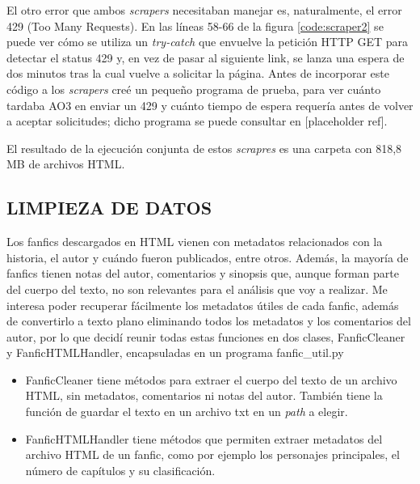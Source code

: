 \documentclass{pre-tfg}
\newcommand{\refToTrialCode}{[placeholder ref]}
\begin{document}
El otro error que ambos \textit{scrapers} necesitaban manejar es, naturalmente, el error 429 (Too Many Requests). En las líneas 58-66 de la figura \ref{code:scraper2} se puede ver cómo se utiliza un \textit{try-catch} que envuelve la petición HTTP GET para detectar el status 429 y, en vez de pasar al siguiente link, se lanza una espera de dos minutos tras la cual vuelve a solicitar la página. Antes de incorporar este código a los \textit{scrapers} creé un pequeño programa de prueba, para ver cuánto tardaba AO3 en enviar un 429 y cuánto tiempo de espera requería antes de volver a aceptar solicitudes; dicho programa se puede consultar en \refToTrialCode.
 

El resultado de la ejecución conjunta de estos \textit{scrapres} es una carpeta con 818,8 MB de archivos HTML.

\subsection{LIMPIEZA DE DATOS}
\label{sec:limpiezadatos}
Los fanfics descargados en HTML vienen con metadatos relacionados con la historia, el autor y cuándo fueron publicados, entre otros. Además, la mayoría de fanfics tienen notas del autor, comentarios y sinopsis que, aunque forman parte del cuerpo del texto, no son relevantes para el análisis que voy a realizar.
Me interesa poder recuperar fácilmente los metadatos útiles de cada fanfic, además de convertirlo a texto plano eliminando todos los metadatos y los comentarios del autor, por lo que decidí reunir todas estas funciones en dos clases, FanficCleaner y FanficHTMLHandler, encapsuladas en un programa fanfic\_util.py

\begin{itemize}
	\item FanficCleaner tiene métodos para extraer el cuerpo del texto de un archivo HTML, sin metadatos, comentarios ni notas del autor. También tiene la función de guardar el texto en un archivo txt en un \textit{path} a elegir.
	\item FanficHTMLHandler tiene métodos que permiten extraer metadatos del archivo HTML de un fanfic, como por ejemplo los personajes principales, el número de capítulos y su clasificación.
\end{itemize}
\end{document}
